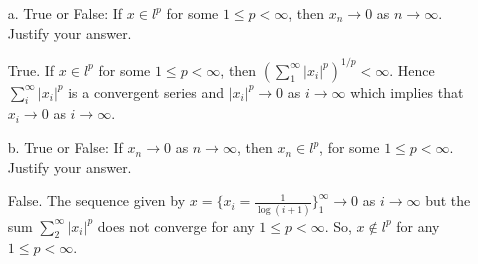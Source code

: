 \begin{enumerate} 
\item[a.] True or False: If $x \in l^p$ for some $1
\leq p < \infty$, then  $x_n \to 0$ as $n \to \infty$.
Justify your answer.

\begin{solution}
    True. If $x\in l^p$ for some $1\leq p<\infty$, then
  $\left(\sum_1^{\infty}{|x_i|^p}\right)^{1/p}<\infty$.
  Hence $\sum_i^{\infty}{|x_i|^p}$ is a convergent series
  and $|x_i|^p\to 0$ as $i\to \infty$ which implies that
  $x_i\to 0$ as $i\to\infty$.
\end{solution}

\item[b.] True or False: If $x_n \to 0$ as $n \to \infty$,
then $x_n \in l^p$, for some $1 \leq p < \infty$.
Justify your answer.

\begin{solution}
    False. The sequence given by $x= \{x_i=\frac{1}{\log (i+1)}\}_1^{\infty}
  \to 0$ as $i\to \infty$ but the sum $\sum_2^{\infty}{
    |x_i|^p
  }$ does not converge for any $1\leq p<\infty$.
  So, $x\notin l^p$ for any $1\leq p<\infty$.
\end{solution}
\end{enumerate}